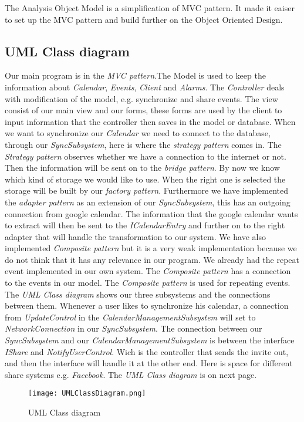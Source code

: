 The Analysis Object Model is a simplification of MVC pattern. It made it eaiser to set up the MVC pattern and build further on the Object Oriented Design. 

\subsection{UML Class diagram}
Our main program is in the \textit{MVC pattern}.The Model is used to keep the information about \textit{Calendar}, \textit{Events}, \textit{Client} and \textit{Alarms}. The \textit{Controller} deals with modification of the model, e.g. synchronize and share events. The view consist of our main view and our forms, these forms are used by the client to input information that the controller then saves in the model or database.
When we want to synchronize our \textit{Calendar} we need to connect to the database, through our \textit{SyncSubsystem}, here is where the \textit{strategy pattern} comes in. The \textit{Strategy pattern} observes whether we have a connection to the internet or not. Then the information will be sent on to the \textit{bridge pattern}. By now we know which kind of storage we would like to use. When the right one is selected the storage will be built by our \textit{factory pattern}. 
Furthermore we have implemented the \textit{adapter pattern} as an extension of our \textit{SyncSubsystem}, this has an outgoing connection from google calendar. The information that the google calendar wants to extract will then be sent to the \textit{ICalendarEntry} and further on to the right adapter that will handle the transformation to our system. 
We have also implemented \textit{Composite pattern} but it is a very weak implementation because we do not think that it has any relevance in our program. We already had the repeat event implemented in our own system. The \textit{Composite pattern} has a connection to the events in our model. The \textit{Composite pattern} is used for repeating events.
\newline
The \textit{UML Class diagram} shows our three subsystems and the connections between them. Whenever a user likes to synchronize his calendar, a connection from \textit{UpdateControl} in the \textit{CalendarManagementSubsystem} will set to \textit{NetworkConnection} in our \textit{SyncSubsystem}.
The connection between our \textit{SyncSubsystem} and our \textit{CalendarManagementSubsystem} is between the interface \textit{IShare} and \textit{NotifyUserControl}. Wich is the controller that sends the invite out, and then the interface will handle it at the other end. Here is space for different share systems e.g. \textit{Facebook}. 
\newline
\newline
The \textit{UML Class diagram} is on next page.

\begin{sidewaysfigure}
\centering
\texttt{[image: UMLClassDiagram.png]}
\caption{UML Class diagram \label{img:UMLClassDiagram}}
\end{sidewaysfigure}
